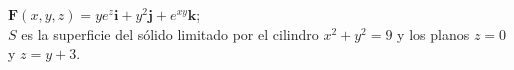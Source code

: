 \item $\mathbf{F}(x, y, z) = ye^z\mathbf{i} + y^2\mathbf{j} + e^{xy}\mathbf{k}$;\\
    $S$ es la superficie del sólido limitado por el cilindro $x^2 + y^2 = 9$ y los planos $z = 0$ y $z = y + 3$.
